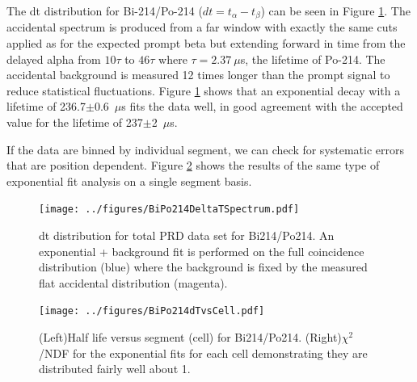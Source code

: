 The dt distribution for Bi-214/Po-214 ($dt=t_{\alpha}-t_{\beta}$) can be seen in Figure \ref{fig:Po214dtcum}. The accidental spectrum is produced from a far window with exactly the same cuts applied as for the expected prompt beta but extending forward in time from the delayed alpha from $10\tau$ to $46\tau$ where $\tau=2.37~\mu$s, the lifetime of Po-214. The accidental background is measured 12 times longer than the prompt signal to reduce statistical fluctuations. Figure \ref{fig:Po214dtcum} shows that an exponential decay with a lifetime of 236.7$\pm$0.6~$\mu$s fits the data well, in good agreement with the accepted value for the lifetime of 237$\pm$2~$\mu$s. 

If the data are binned by individual segment, we can check for systematic errors that are position dependent. Figure \ref{fig:Po214thalfvscell} shows the results of the same type of exponential fit analysis on a single segment basis.  
\begin{figure}[!h]
\centering
\texttt{[image: ../figures/BiPo214DeltaTSpectrum.pdf]}
\caption{\label{fig:Po214dtcum}dt distribution for total PRD data set for Bi214/Po214. An exponential + background fit is performed on the full coincidence distribution (blue) where the background is fixed by the measured flat accidental distribution (magenta). }
\end{figure}
\begin{figure}[!h]
	\centering
	\texttt{[image: ../figures/BiPo214dTvsCell.pdf]}
	\caption{\label{fig:Po214thalfvscell}(Left)Half life versus segment (cell) for Bi214/Po214. (Right)$\chi^2$/NDF for the exponential fits for each cell demonstrating they are distributed fairly well about 1.}
\end{figure}

